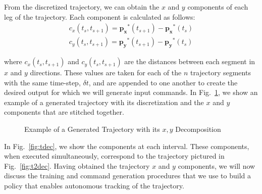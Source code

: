 \documentclass[letterpaper, 10 pt, conference]{ieeeconf}  %
\begin{document}
From the discretized trajectory, we can obtain the $x$ and $y$ components of each leg of the trajectory. Each component is calculated as follows:
\begin{align}
    c_{x}(t_s,t_{s+1}) = \mathbf{p_x}^*(t_{s+1}) - \mathbf{p_x}^*(t_{s}) \nonumber \\
    c_{y}(t_s,t_{s+1}) = \mathbf{p_y}^*(t_{s+1}) - \mathbf{p_y}^*(t_{s})
\end{align}

where $c_{x}(t_s,t_{s+1})$ and $c_{y}(t_s,t_{s+1})$ are the distances between each segment in $x$ and $y$ directions. These values are taken for each of the $n$ trajectory segments with the same time-step, $\delta t$, and are appended to one another to create the desired output for which we will generate input commands. In Fig.~\ref{fig:trajdec}, we show an example of a generated trajectory with its discretization and the $x$ and $y$ components that are stitched together.
\begin{figure}[h]
	\centering
	\caption{Example of a Generated Trajectory with its $x,y$ Decomposition}
	\label{fig:trajdec}
\end{figure}

In Fig.~\ref{fig:tdec}, we show the components at each interval. These components, when executed simultaneously, correspond to the trajectory pictured in Fig.~\ref{fig:t2dec}. Having obtained the trajectory $x$ and $y$ components, we will now discuss the training and command generation procedures that we use to build a policy that enables autonomous tracking of the trajectory.
\end{document}
